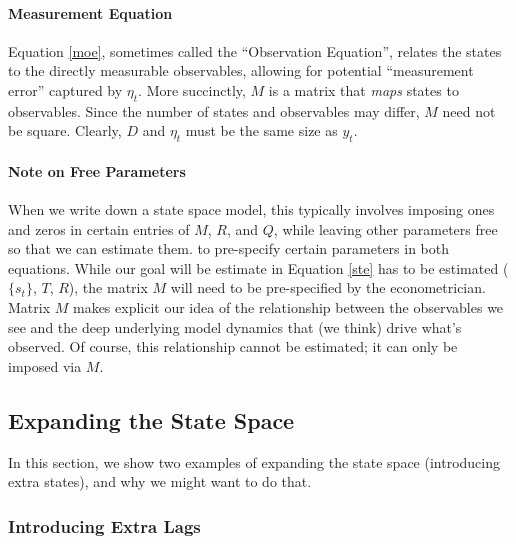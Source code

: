 \documentclass[a4paper,12pt]{article}
\begin{document}
\paragraph{Measurement Equation} Equation \ref{moe}, sometimes called the ``Observation Equation'', relates the states to the directly measurable observables, allowing for potential ``measurement error'' captured by $\eta_t$. More succinctly, $M$ is a matrix that \emph{maps} states to observables. Since the number of states and observables may differ, $M$ need not be square. Clearly, $D$ and $\eta_t$ must be the same size as $y_t$.

\paragraph{Note on Free Parameters} 
When we write down a state space model, this typically
involves imposing ones and zeros in certain entries of $M$,
$R$, and $Q$, while leaving other parameters free so that we can
estimate them.  to pre-specify certain parameters in both
equations.  While our goal will be estimate in Equation
\ref{ste} has to be estimated ($\{s_t\}$, $T$, $R$), the
matrix $M$ will need to be pre-specified by the
econometrician. Matrix $M$ makes explicit our idea of the
relationship between the observables we see and the deep
underlying model dynamics that (we think) drive what's
observed. Of course, this relationship cannot be estimated; it
can only be imposed via $M$.

\newpage
\subsection{Expanding the State Space}

In this section, we show two examples of expanding the state space (introducing extra states), and why we might want to do that. 

\subsubsection{Introducing Extra Lags}
\end{document}
